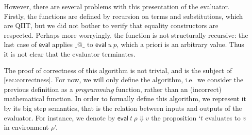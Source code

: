 \documentclass[a4paper,UKenglish,cleveref]{lipics-v2019}
\newcommand{\agdaSymb}[1]{\mathsf{#1}}
\newcommand{\eval}{\agdaSymb{eval}}
\newcommand{\Da}{\Downarrow}
\begin{document}
However, there are several problems with this presentation of the evaluator.
Firstly, the functions are defined by recursion on terms and substitutions,
which are QIIT, but we did not bother to verify that equality constructors
are respected. Perhaps more worryingly, the function is not structurally
recursive: the last case of $\eval$ applies $\_@\_$ to $\eval\ u\ p$, which
a priori is an arbitrary value. Thus it is not clear that the evaluator
terminates.

The proof of correctness of this algorithm is not trivial, and is the subject
of \cref{sec:correctness}. For now, we will only define the algorithm, i.e.\
we consider the previous definition as a \emph{programming} function, rather
than an (incorrect) mathematical function. In order to formally define this
algorithm, we represent it by its big step semantics, that is the relation
between inputs and outputs of the evaluator. For instance, we denote by
$\eval\ t\ \rho \Da v$ the proposition `$t$ evaluates to $v$ in environment
$\rho$'.
\end{document}
